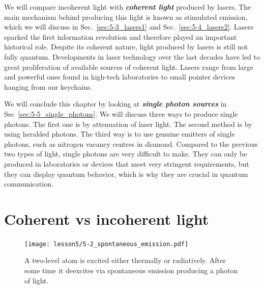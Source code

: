 We will compare incoherent light with \textit{\textbf{coherent light}} produced by lasers. The main mechanism behind producing this light is known as stimulated emission, which we will discuss in Sec.~\ref{sec:5-3_lasers1} and Sec.~\ref{sec:5-4_lasers2}.
Lasers sparked the first information revolution and therefore played an important historical role.
Despite its coherent nature, light produced by lasers is still not fully quantum. 
Developments in laser technology over the last decades have led to great proliferation of available sources of coherent light.
Lasers range from large and powerful ones found in high-tech laboratories to small pointer devices hanging from our keychains.

We will conclude this chapter by looking at \textit{\textbf{single photon sources}} in Sec~\ref{sec:5-5_single_photons}.
We will discuss three ways to produce single photons.
The first one is by attenuation of laser light.
The second method is by using heralded photons.
The third way is to use genuine emitters of single photons, such as nitrogen vacancy centres in diamond.
Compared to the previous two types of light, single photons are very difficult to make.
They can only be produced in laboratories or devices that meet very stringent requirements, but they can display quantum behavior, which is why they are crucial in quantum communication.



\section{Coherent vs incoherent light}
\label{sec:5-2_coherent_vs_incoherent}

\begin{figure}
    \centering
    \texttt{[image: lesson5/5-2\_spontaneous\_emission.pdf]}
    \caption[Spontaneous emission]{A two-level atom is excited either thermally or radiatively. After some time it deexcites via spontaneous emission producing a photon of light.}
    \label{fig:5-2_spontaneous_emission}
\end{figure}

